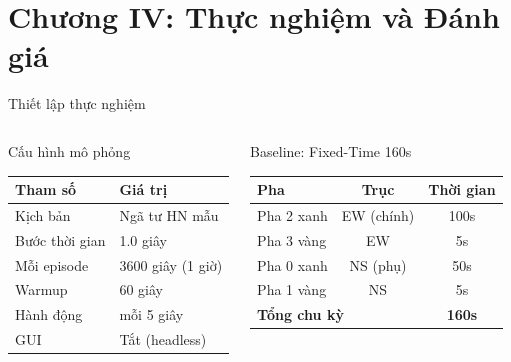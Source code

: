 \section{Chương IV: Thực nghiệm và Đánh giá}

\begin{frame}{Thiết lập thực nghiệm}
  \begin{columns}[T]
    \begin{block}{Cấu hình mô phỏng}
      \begin{tabular}{@{}ll}
        \toprule
        \textbf{Tham số} & \textbf{Giá trị}\\
        \midrule
        Kịch bản    & Ngã tư HN mẫu\\
        Bước thời gian & 1.0 giây\\
        Mỗi episode & 3600 giây (1 giờ)\\
        Warmup      & 60 giây\\
        Hành động   & mỗi 5 giây\\
        GUI         & Tắt (headless)\\
        \bottomrule
      \end{tabular}
    \end{block}
    \vspace{6pt}
    \begin{block}{Baseline: Fixed-Time 160s}
      \begin{tabular}{@{}lcc}
        \toprule
        \textbf{Pha} & \textbf{Trục} & \textbf{Thời gian}\\
        \midrule
        Pha 2 xanh & EW (chính) & 100s\\
        Pha 3 vàng & EW         & 5s\\
        Pha 0 xanh & NS (phụ)   & 50s\\
        Pha 1 vàng & NS         & 5s\\
        \midrule
        \multicolumn{2}{l}{\textbf{Tổng chu kỳ}} & \textbf{160s}\\
        \bottomrule
      \end{tabular}
    \end{block}


\end{columns}
\end{frame}
